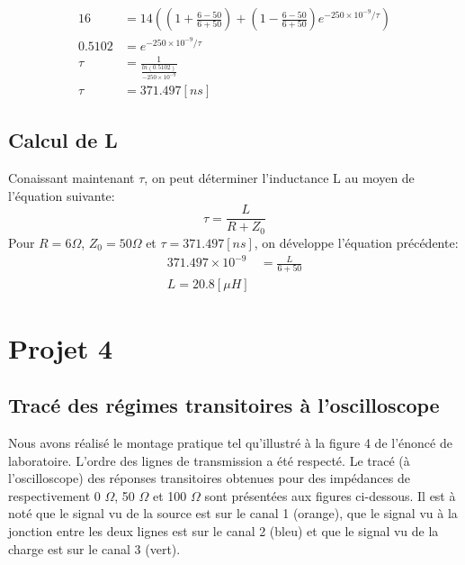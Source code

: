 \begin{align*}
16 &= 14 \left( \left(1 + \frac{6 - 50}{6 + 50}\right) + \left(1 -\frac{6 - 50}{6 + 50}\right) e^{-250 \times 10^{-9}/\tau} \right)\\
0.5102 &= e^{-250 \times 10^{-9}/\tau}\\
\tau   &= \frac{1}{\frac{ln(0.5102)}{-250 \times 10^{-9}}}\\
\tau   &= 371.497\left[ns\right]
\end{align*}

\subsection*{Calcul de L}

Conaissant maintenant $\tau$, on peut déterminer l'inductance L au moyen de l'équation suivante:
\begin{equation}
\tau = \frac{L}{R + Z_0}
\end{equation}
Pour $R = 6 \Omega$, $Z_0 = 50 \Omega$ et $\tau = 371.497\left[ns\right]$, on développe l'équation précédente:
\begin{align*}
371.497\times 10^{-9} &= \frac{L}{6 + 50}\\
L = 20.8 \left[\mu H\right]
\end{align*}
\newpage
\section{Projet 4}
\subsection{Tracé des régimes transitoires à l'oscilloscope}
\label{s:tracer_transitoire}
Nous avons réalisé le montage pratique tel qu'illustré à la figure 4 de l'énoncé de laboratoire. L'ordre des lignes de transmission a été respecté. Le tracé (à l'oscilloscope) des réponses transitoires obtenues pour des impédances de respectivement 0 $\Omega$, 50 $\Omega$ et 100 $\Omega$ sont présentées aux figures ci-dessous. Il est à noté que le signal vu de la source est sur le canal 1 (orange), que le signal vu à la jonction entre les deux lignes est sur le canal 2 (bleu) et que le signal vu de la charge est sur le canal 3 (vert).

